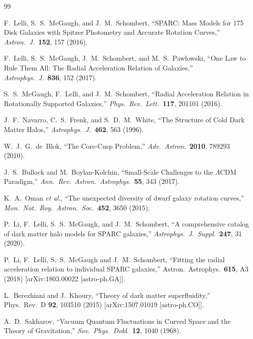 \documentclass[11pt,a4paper]{article}
\begin{document}
\begin{thebibliography}{99}

F.~Lelli, S.~S.~McGaugh, and J.~M.~Schombert,
``SPARC: Mass Models for 175 Disk Galaxies with Spitzer Photometry
and Accurate Rotation Curves,''
\textit{Astron.\ J.}\ \textbf{152}, 157 (2016).

F.~Lelli, S.~S.~McGaugh, J.~M.~Schombert, and M.~S.~Pawlowski,
``One Law to Rule Them All: The Radial Acceleration Relation of Galaxies,''
\textit{Astrophys.\ J.}\ \textbf{836}, 152 (2017).

S.~S.~McGaugh, F.~Lelli, and J.~M.~Schombert,
``Radial Acceleration Relation in Rotationally Supported Galaxies,''
\textit{Phys.\ Rev.\ Lett.}\ \textbf{117}, 201101 (2016).

J.~F.~Navarro, C.~S.~Frenk, and S.~D.~M.~White,
``The Structure of Cold Dark Matter Halos,''
\textit{Astrophys.\ J.}\ \textbf{462}, 563 (1996).

W.~J.~G.~de~Blok,
``The Core-Cusp Problem,''
\textit{Adv.\ Astron.}\ \textbf{2010}, 789293 (2010).

J.~S.~Bullock and M.~Boylan-Kolchin,
``Small-Scale Challenges to the $\Lambda$CDM Paradigm,''
\textit{Ann.\ Rev.\ Astron.\ Astrophys.}\ \textbf{55}, 343 (2017).

K.~A.~Oman \textit{et al.},
``The unexpected diversity of dwarf galaxy rotation curves,''
\textit{Mon.\ Not.\ Roy.\ Astron.\ Soc.}\ \textbf{452}, 3650 (2015).

P.~Li, F.~Lelli, S.~S.~McGaugh, and J.~M.~Schombert,
``A comprehensive catalog of dark matter halo models for SPARC galaxies,''
\textit{Astrophys.\ J.\ Suppl.}\ \textbf{247}, 31 (2020).

P.~Li, F.~Lelli, S.~S.~McGaugh and J.~M.~Schombert,
``Fitting the radial acceleration relation to individual SPARC
galaxies,''
Astron.\ Astrophys.\ \textbf{615}, A3 (2018)
[arXiv:1803.00022 [astro-ph.GA]].

L.~Berezhiani and J.~Khoury,
``Theory of dark matter superfluidity,''
Phys.\ Rev.\ D \textbf{92}, 103510 (2015)
[arXiv:1507.01019 [astro-ph.CO]].

A.~D.~Sakharov,
``Vacuum Quantum Fluctuations in Curved Space and the Theory of
Gravitation,''
\textit{Sov.\ Phys.\ Dokl.}\ \textbf{12}, 1040 (1968).


\end{thebibliography}
\end{document}
